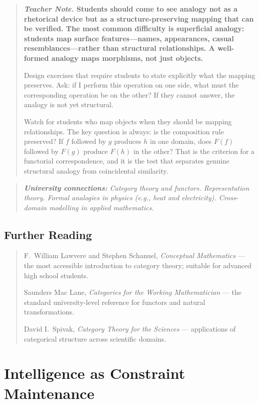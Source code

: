 \documentclass[11pt]{book}
\theoremstyle{plain}
\theoremstyle{definition}
\theoremstyle{remark}
\newenvironment{teachernote}
  {\begin{quote}\small\bfseries\textit{Teacher Note.}\normalfont\small\enspace\ignorespaces}
  {\end{quote}}
\newenvironment{universitybridge}
  {\begin{quote}\small\itshape\textbf{University connections:}\normalfont\small\itshape\enspace\ignorespaces}
  {\end{quote}}
\newenvironment{readinglist}
  {\begin{quote}\small}
  {\end{quote}}
\begin{document}
\begin{teachernote}
Students should come to see analogy not as a rhetorical device but as a
structure-preserving mapping that can be verified. The most common
difficulty is superficial analogy: students map surface features---names,
appearances, casual resemblances---rather than structural relationships.
A well-formed analogy maps morphisms, not just objects.

Design exercises that require students to state explicitly what the
mapping preserves. Ask: if I perform this operation on one side, what
must the corresponding operation be on the other? If they cannot answer,
the analogy is not yet structural.

Watch for students who map objects when they should be mapping
relationships. The key question is always: is the composition rule
preserved? If $f$ followed by $g$ produces $h$ in one domain, does
$F(f)$ followed by $F(g)$ produce $F(h)$ in the other? That is the
criterion for a functorial correspondence, and it is the test that
separates genuine structural analogy from coincidental similarity.
\end{teachernote}

\begin{universitybridge}
Category theory and functors. Representation theory. Formal analogies
in physics (e.g., heat and electricity). Cross-domain modelling in
applied mathematics.
\end{universitybridge}

\section*{Further Reading}

\begin{readinglist}
F.~William Lawvere and Stephen Schanuel, \textit{Conceptual
Mathematics} --- the most accessible introduction to category theory;
suitable for advanced high school students.

Saunders Mac Lane, \textit{Categories for the Working Mathematician}
--- the standard university-level reference for functors and natural
transformations.

David I.~Spivak, \textit{Category Theory for the Sciences} ---
applications of categorical structure across scientific domains.
\end{readinglist}

\chapter{Intelligence as Constraint Maintenance}
\end{document}

